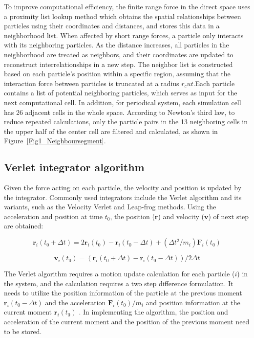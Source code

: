 \documentclass{article}
\begin{document}
\noindent
To improve computational efficiency, the finite range force in the direct space 
uses a proximity list lookup method which obtains the spatial relationships 
between particles using their coordinates and distances, and stores this data 
in a neighborhood list. 
When affected by short range forces, a particle only interacts with its 
neighboring particles. 
As the distance increases, all particles in the neighborhood are treated as 
neighbors, and their coordinates are updated to reconstruct interrelationships 
in a new step. 
The neighbor list is constructed based on each particle's position within a 
specific region, assuming that the interaction force between particles is 
truncated at a radius $r_cut$.Each particle contains a list of potential 
neighboring particles, which serves as input for the next computational cell.
In addition, for periodical system, each simulation cell has 26 adjacent cells 
in the whole space. 
According to Newton's third law, to reduce repeated calculations, only the 
particle pairs in the 13 neighboring cells in the upper half of the center cell 
are filtered and calculated, as shown in Figure~\ref{Fig1_Neighboursegment}.\\



\subsection{Verlet integrator algorithm}

\noindent
Given the force acting on each particle, the velocity and position is updated 
by the integrator. 
Commonly used integrators include the Verlet algorithm and its variants, such 
as the Velocity Verlet and Leap-frog methods. 
Using the acceleration and position at time $t_0$, the position ($\mathbf{r}$) 
and velocity ($\mathbf{v}$) of next step are obtained:

\begin{equation}
    \mathbf{r}_{i}(t_{0}+\Delta t ) = 
        2\mathbf{r}_{i}(t_{0}) - \mathbf{r}_{i}(t_{0}-\Delta t) + (\Delta t^2/m_{i}) \boldsymbol{F}_{i}(t_{0})
\end{equation}

\begin{equation}
    \mathbf{v}_{i}(t_{0}) = 
        (\mathbf{r}_{i}(t_{0}+\Delta t )-\mathbf{r}_{i}(t_{0}-\Delta t ))/2\Delta t
\end{equation}

\noindent
The Verlet algorithm requires a motion update calculation for each particle 
($i$) in the system, and the calculation requires a two step difference 
formulation. 
It needs to utilize the position information of the particle at the previous 
moment $\mathbf{r}_{i}(t_{0}-\Delta t)$ and the acceleration 
$\boldsymbol{F}_{i}(t_{0})/m_{i}$ and position information at the current 
moment $\mathbf{r}_{i}(t_{0})$ . 
In implementing the algorithm, the position and acceleration of the current 
moment and the position of the previous moment need to be stored.\\
\end{document}
